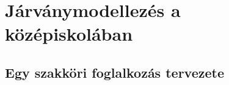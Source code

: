 \chapter{Járványmodellezés a középiskolában}
\label{ch:teaching}

\section{Egy szakköri foglalkozás tervezete}
